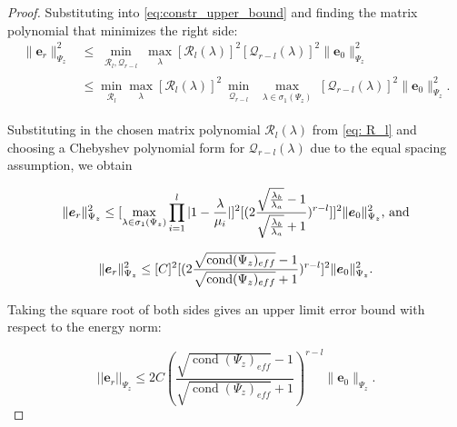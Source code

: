 \documentclass[10pt,a4paper]{amsart}
\newcommand{\vect}[1]{\ensuremath{\bm{#1}}}
\begin{document}
\begin{proof}
    Substituting into \eqref{eq:constr_upper_bound} and finding the matrix polynomial that minimizes the right side:
    \begin{align}
    \| \vect{e}_r\|_{\Psi_{z}}^2 
    &\leq \min\limits_{\substack{\mathcal{R}_l,\mathcal{Q}_{r-l}}} \max\limits_{\substack{\lambda}}[\mathcal{R}_l(\lambda)]^2[\mathcal{Q}_{r-l}(\lambda)]^2 \| \vect{e}_0\|_{\Psi_{z}}^2 \\
    &\leq \min\limits_{\substack{\mathcal{R}_l}} \max\limits_{\substack{\lambda}}[\mathcal{R}_l(\lambda)]^2\min\limits_{\substack{\mathcal{Q}_{r-l}}} \max\limits_{\substack{\lambda \in \sigma_1(\Psi_{z})}}[\mathcal{Q}_{r-l}(\lambda)]^2 \| \vect{e}_0\|_{\Psi_{z}}^2.
    \end{align}

    Substituting in the chosen matrix polynomial $\mathcal{R}_l(\lambda)$ from \eqref{eq: R_l} and choosing a Chebyshev polynomial form for $\mathcal{Q}_{r-l}(\lambda)$ due to the equal spacing assumption, we obtain

    \begin{equation}
    \| \vect{e}_r\|_{\Psi_{z}}^2 \leq [\max\limits_{\substack{\lambda \in \sigma_1(\Psi_{z})}} \prod_{i=1}^{l} | 1-\frac{\lambda}{\mu_i}|]^2[(2\frac{\sqrt{\frac{\lambda_b}{\lambda_a}} - 1}{\sqrt{\frac{\lambda_b}{\lambda_a}} +1})^{r-l}]]^2 \| \vect{e}_0\|_{\Psi_{z}}^2 \text{, and}\\
    \end{equation}

    \begin{equation}
    \| \vect{e}_r\|_{\Psi_{z}}^2 \leq [C]^2
    [(2\frac{\sqrt{\operatorname{cond}(\Psi_{z})_{eff}} - 1}{\sqrt{\operatorname{cond}(\Psi_{z})_{eff}} +1})^{r-l}]^2 \| \vect{e}_0\|_{\Psi_{z}}^2 .\\
    \end{equation}

    Taking the square root of both sides gives an upper limit error bound with respect to the energy norm:

    \begin{equation}
    ||\vect{e}_r||_{\Psi_{z}} \leq 2C(\frac{\sqrt{\operatorname{cond}(\Psi_{z})_{eff}} - 1}{\sqrt{\operatorname{cond}(\Psi_{z})_{eff}} +1})^{r-l} \| \vect{e}_0\|_{\Psi_{z}}.
    \end{equation}
\end{proof}
\end{document}

